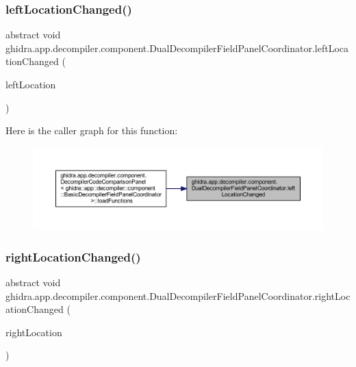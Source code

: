 \subsubsection{\texorpdfstring{leftLocationChanged()}{leftLocationChanged()}}
{\footnotesize\ttfamily abstract void ghidra.\+app.\+decompiler.\+component.\+Dual\+Decompiler\+Field\+Panel\+Coordinator.\+left\+Location\+Changed (\begin{DoxyParamCaption}\item[{Program\+Location}]{left\+Location }\end{DoxyParamCaption})\hspace{0.3cm}{\ttfamily [abstract]}}

Here is the caller graph for this function\+:
\nopagebreak
\begin{figure}[H]
\begin{center}
\leavevmode
\includegraphics[width=350pt]{classghidra_1_1app_1_1decompiler_1_1component_1_1_dual_decompiler_field_panel_coordinator_a9bab738b2c867a3a99540a68d9737c4a_icgraph}
\end{center}
\end{figure}
\mbox{\label{classghidra_1_1app_1_1decompiler_1_1component_1_1_dual_decompiler_field_panel_coordinator_aa1d01c29c03580ba477976b8d1ff4593}} 
\subsubsection{\texorpdfstring{rightLocationChanged()}{rightLocationChanged()}}
{\footnotesize\ttfamily abstract void ghidra.\+app.\+decompiler.\+component.\+Dual\+Decompiler\+Field\+Panel\+Coordinator.\+right\+Location\+Changed (\begin{DoxyParamCaption}\item[{Program\+Location}]{right\+Location }\end{DoxyParamCaption})\hspace{0.3cm}{\ttfamily [abstract]}}



